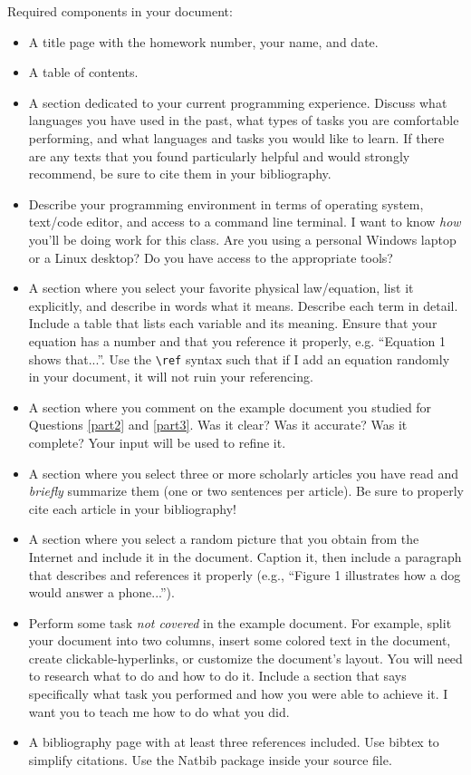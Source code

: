 \documentclass[12pt, letterpaper]{article}
\begin{document}
Required components in your document:
\begin{itemize}
  \item A title page with the homework number, your name, and date.
  \item A table of contents.
  \item A section dedicated to your current programming experience.  Discuss
    what languages you have used in the past, what types of tasks you are
    comfortable performing, and what languages and tasks you would like to 
    learn.  If there are any texts that you found particularly helpful and
    would strongly recommend, be sure to cite them in your bibliography.
  \item Describe your programming environment in terms of operating system,
    text/code editor, and access to a command line terminal.  I want to know
    \emph{how} you'll be doing work for this class.  Are you using a personal
    Windows laptop or a Linux desktop?  Do you have access to the appropriate
    tools?
  \item A section where you select your favorite physical law/equation, list
    it explicitly, and describe in words what it means.  Describe each term in
    detail.  Include a table that lists each variable and its meaning.  Ensure
    that your equation has a number and that you reference it properly, e.g.
    ``Equation 1 shows that...''.  Use the {\tt \textbackslash ref} syntax such
    that if I add an equation randomly in your document, it will not 
    ruin your referencing.
  \item A section where you comment on the example document you studied for
    Questions \ref{part2} and \ref{part3}.  Was it clear?  Was it accurate?
    Was it complete?  Your input will be used to refine it.
  \item A section where you select three or more scholarly articles you have
    read and \emph{briefly} summarize them (one or two sentences per article).
    Be sure to properly cite each article in your bibliography!
  \item A section where you select a random picture that you obtain from
    the Internet and include it in the document.  Caption it, then include
    a paragraph that describes and references it properly (e.g., ``Figure 1
    illustrates how a dog would answer a phone...'').
  \item Perform some task \emph{not covered} in the example document.  For
    example, split your document into two columns, insert some colored text
    in the document, create clickable-hyperlinks, or customize the document's
    layout.  You will need to research what to do and how to do it.
    Include a section that says specifically what task you performed and how you
    were able to achieve it.  I want you to teach me how to do what you did.
  \item A bibliography page with at least three references
    included.  Use bibtex to simplify citations.  Use the Natbib package
    inside your source file.
\end{itemize}
\end{document}
